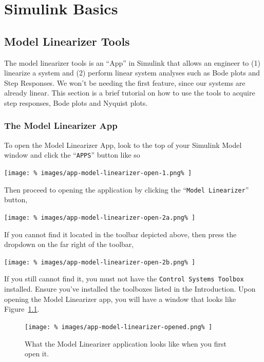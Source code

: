 \chapter{Simulink Basics}\label{App:Simulink}

\section{Model Linearizer Tools}
The model linearizer tools is an ``App'' in Simulink that allows an engineer to
(1) linearize a system and (2) perform linear system analyses such as Bode
plots and Step Responses. We won't be needing the first feature, since our
systems are already linear. This section is a brief tutorial on how to use
the tools to acquire step responses, Bode plots and Nyquist plots.

\subsection{The Model Linearizer App}
To open the Model Linearizer App, look to the top of your Simulink Model
window and click the ``\texttt{APPS}'' button like so
%
\begin{center}
  \texttt{[image: \%
    images/app-model-linearizer-open-1.png\%
  ]}
\end{center}
%
Then proceed to opening the application by clicking the ``\texttt{Model
Linearizer}'' button,
%
\begin{center}
  \texttt{[image: \%
    images/app-model-linearizer-open-2a.png\%
  ]}
\end{center}
%
If you cannot find it located in the toolbar depicted above, then press the
dropdown on the far right of the toolbar,
%
\begin{center}
  \texttt{[image: \%
    images/app-model-linearizer-open-2b.png\%
  ]}
\end{center}
%
If you still cannot find it, you must not have the \texttt{Control Systems
Toolbox} installed. Ensure you've installed the toolboxes listed in the
Introduction. Upon opening the Model Linearizer app, you
will have a window that looks like Figure~\ref{fig:app1:model-linearizer}.
%
\begin{figure}[H]
  \centering
  \texttt{[image: \%
    images/app-model-linearizer-opened.png\%
  ]}
  \caption[The Model Linearizer App]{%
    What the Model Linearizer application looks like when you first open it.%
  }
  \label{fig:app1:model-linearizer}
\end{figure}

